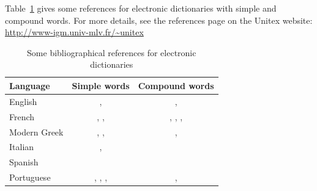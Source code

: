 Table~\ref{ref-dicos} gives some references for electronic dictionaries with simple and 
compound words. For more details, see the references page on the Unitex website: \\
\url{http://www-igm.univ-mlv.fr/~unitex}

\begin{table}[!h]
\begin{center}
\begin{tabular}{|l|c|c|}
\hline
\textbf{Language} & \textbf{Simple words} & \textbf{Compound words} \\
\hline
English & \cite{klarsfeld}, \cite{monceaux-1995} & \cite{delac-anglais},
\cite{these-Savary} \\
\hline
French & \cite{formes-ambigues}, \cite{dicos-francais}, \cite{jacques-1995} & \cite{dicos-francais},
\cite{Gross96},
\cite{max-1993},
\cite{syntaxe-de-ladverbe} \\
\hline
Modern Greek & \cite{modern-greek}, \cite{matthieu-anastasia}, \cite{these-tita} & \cite{tita-2002},
\cite{anastasia-2002} \\
\hline
Italian & \cite{delaf-italien}, \cite{delaf-italien-book} & \cite{composes-italien} \\
\hline
Spanish & \cite{blanco-2000} & \cite{blanco-1997} \\
\hline
Portuguese & \cite{eleuterio1995}, \cite{ranchhod1996b}, \cite{ranchhodd1998},
\cite{muniz2005} & \cite{ranchhod1991}, \cite{ranchhodd1998} \\
\hline
\end{tabular}
\caption{Some bibliographical references for electronic dictionaries\label{ref-dicos}}
\end{center}
\end{table}
